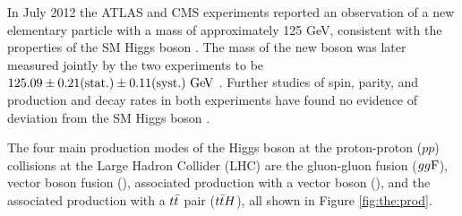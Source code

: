 In July 2012 the ATLAS and CMS experiments reported an observation of a new elementary particle with a
mass of approximately 125 GeV, consistent with the properties of the SM Higgs boson
\cite{Aad:2012tfa, Chatrchyan:2012xdj}. The mass of the new boson was later measured
jointly by the two experiments to be $125.09 \pm 0.21 (\text{stat.}) \pm 0.11 (\text{syst.})~\text{Ge\kern -0.1em V}$
\cite{Aad:2015zhl}. Further studies of spin, parity, and production
and decay rates in both experiments have found no evidence of deviation from the SM
Higgs boson \cite{Aad:2015mxa, PhysRevD.92.012004, Khachatryan:2016vau, Aad:2019mbh}.

The four main production modes of the Higgs boson at the proton-proton ($pp$) collisions
at the Large Hadron Collider (LHC) are the gluon-gluon fusion ($gg\text{F}$), vector boson fusion
(\vbf), associated production with a vector boson (\vh), and the associated production with
a $t\bar{t}$ pair ($t\bar{t} H$), all shown in Figure \ref{fig:the:prod}.

